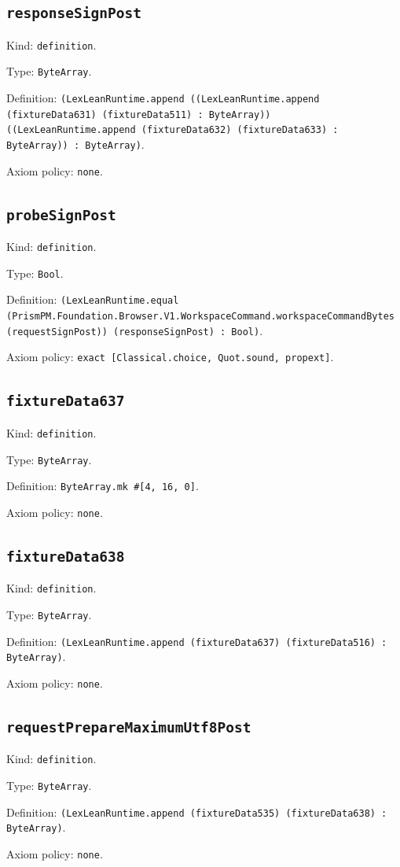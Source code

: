 \documentclass[11pt]{article}
\begin{document}
\subsection*{\texttt{responseSignPost}}
\noindent Kind: \texttt{definition}.\par
\noindent Type: \texttt{ByteArray}.\par
\noindent Definition: \texttt{(LexLeanRuntime.append ((LexLeanRuntime.append (fixtureData631) (fixtureData511) : ByteArray)) ((LexLeanRuntime.append (fixtureData632) (fixtureData633) : ByteArray)) : ByteArray)}.\par
\noindent Axiom policy: \texttt{none}.\par
\subsection*{\texttt{probeSignPost}}
\noindent Kind: \texttt{definition}.\par
\noindent Type: \texttt{Bool}.\par
\noindent Definition: \texttt{(LexLeanRuntime.equal (PrismPM.Foundation.Browser.V1.WorkspaceCommand.workspaceCommandBytes (requestSignPost)) (responseSignPost) : Bool)}.\par
\noindent Axiom policy: \texttt{exact [Classical.choice, Quot.sound, propext]}.\par
\subsection*{\texttt{fixtureData637}}
\noindent Kind: \texttt{definition}.\par
\noindent Type: \texttt{ByteArray}.\par
\noindent Definition: \texttt{ByteArray.mk \#[4, 16, 0]}.\par
\noindent Axiom policy: \texttt{none}.\par
\subsection*{\texttt{fixtureData638}}
\noindent Kind: \texttt{definition}.\par
\noindent Type: \texttt{ByteArray}.\par
\noindent Definition: \texttt{(LexLeanRuntime.append (fixtureData637) (fixtureData516) : ByteArray)}.\par
\noindent Axiom policy: \texttt{none}.\par
\subsection*{\texttt{requestPrepareMaximumUtf8Post}}
\noindent Kind: \texttt{definition}.\par
\noindent Type: \texttt{ByteArray}.\par
\noindent Definition: \texttt{(LexLeanRuntime.append (fixtureData535) (fixtureData638) : ByteArray)}.\par
\noindent Axiom policy: \texttt{none}.\par
\end{document}
